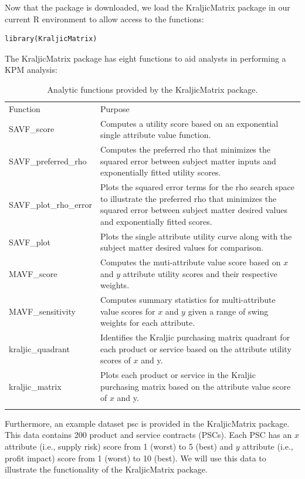\documentclass[twocolumn]{svjour3}       %
\begin{document}
Now that the package is downloaded, we load the KraljicMatrix package in our current R environment to allow access to the functions:
\begin{verbatim}
library(KraljicMatrix)
\end{verbatim}
The KraljicMatrix package has eight functions to aid analysts in performing a KPM analysis:
\begin{table}[!htb]
  \caption{Analytic functions provided by the KraljicMatrix package.}
  \label{tab:1}       %
  \begin{tabular}{lp{10cm}}
    \hline\noalign{\smallskip}
    Function & Purpose  \\
    \noalign{\smallskip}\hline\noalign{\smallskip}
    SAVF\_score & Computes a utility score based on an exponential single attribute value function. \\
    SAVF\_preferred\_rho & Computes the preferred rho that minimizes the squared error between subject matter inputs and exponentially fitted utility scores. \\
    SAVF\_plot\_rho\_error & Plots the squared error terms for the rho search space to illustrate the preferred rho that minimizes the squared error between subject matter desired values and exponentially fitted scores. \\
    SAVF\_plot & Plots the single attribute utility curve along with the subject matter desired values for comparison. \\
    MAVF\_score & Computes the muti-attribute value score based on $x$ and $y$ attribute utility scores and their respective weights. \\
    MAVF\_sensitivity & Computes summary statistics for multi-attribute value scores for $x$ and $y$ given a range of swing weights for each attribute. \\
    kraljic\_quadrant & Identifies the Kraljic purchasing matrix quadrant for each product or service based on the attribute utility scores of $x$ and y. \\
    kraljic\_matrix & Plots each product or service in the Kraljic purchasing matrix based on the attribute value score of $x$ and y. \\
    \noalign{\smallskip}\hline
  \end{tabular}
\end{table}

Furthermore, an example dataset psc is provided in the KraljicMatrix package. This data contains 200 product and service contracts (PSCs). Each PSC has an $x$ attribute (i.e., supply risk) score from 1 (worst) to 5 (best) and $y$ attribute (i.e., profit impact) score from 1 (worst) to 10 (best).  We will use this data to illustrate the functionality of the KraljicMatrix package.
\end{document}
